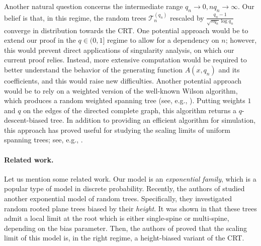 \documentclass{article}
\theoremstyle{remark}
\newcommand{\cT}{\mathcal{T}}
\begin{document}
Another natural question concerns the intermediate range $q_n\to0, nq_n\to\infty$.
Our belief is that, in this regime, the random trees $\cT_n^{(q_n)}$ rescaled by $\frac{q_n-1}{\sqrt{nq_n} \log q_n}$ converge in distribution towards the CRT.
One potential approach would be to extend our proof in the $q\in(0,1]$ regime to allow for a dependency on $n$;
however, this would prevent direct applications of singularity analysis, on which our current proof relies.
Instead, more extensive computation would be required to better understand the behavior of the generating function $A(x,q_n)$ and its coefficients, and this would raise new difficulties.
Another potential approach would be to rely on a weighted version of the well-known Wilson algorithm, which produces a random weighted spanning tree (see, e.g., \cite[Section~9.7]{Lawler_Limic_2010}).
Putting weights $1$ and $q$ on the edges of the directed complete graph, this algorithm returns a $q$-descent-biased tree.
In addition to providing an efficient algorithm for simulation,
this approach has proved useful for studying the scaling limits of uniform spanning trees; see, e.g., \cite{Archer_Shalev_2024,Archer_Nachmias_Shalev_2024}.

\paragraph{Related work.}
Let us mention some related work.
Our model is an \emph{exponential family}, which is a popular type of model in discrete probability.
Recently, the authors of \cite{Durhuus_Unel_2023,Addario-Berry_Corsini_Maitra_Unel_2025} studied another exponential model of random trees.
Specifically, they investigated random rooted plane trees biased by their \emph{height}.
It was shown in \cite{Durhuus_Unel_2023} that these trees admit a local limit at the root which is either single-spine or multi-spine, depending on the bias parameter.
Then, the authors of \cite{Addario-Berry_Corsini_Maitra_Unel_2025} proved that the scaling limit of this model is, in the right regime, a height-biased variant of the CRT.
\medskip
\end{document}

